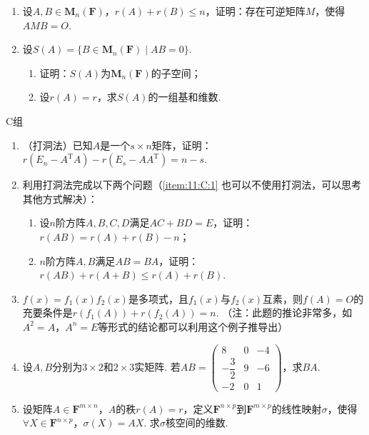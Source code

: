 \begin{enumerate}
    \item 设$A,B \in \mathbf{M}_n(\mathbf{F})$，$r(A)+r(B) \leqslant n$，证明：存在可逆矩阵$M$，使得$AMB=O$.

    \item 设$S(A)=\{B \in \mathbf{M}_n(\mathbf{F}) \mid AB=0\}$.
          \begin{enumerate}
              \item 证明：$S(A)$为$\mathbf{M}_n(\mathbf{F})$的子空间；

              \item 设$r(A)=r$，求$S(A)$的一组基和维数.
          \end{enumerate}
\end{enumerate}

\centerline{\heiti C组}
\begin{enumerate}
    \item （打洞法）已知$A$是一个$s \times n$矩阵，证明：$r(E_n-A^\mathrm{T}A)-r(E_s-AA^\mathrm{T})=n-s$.

    \item 利用打洞法完成以下两个问题（\ref*{item:11:C:1} 也可以不使用打洞法，可以思考其他方式解决）：
          \begin{enumerate}
              \item 设$n$阶方阵$A,B,C,D$满足$AC+BD=E$，证明：$r(AB) = r(A)+r(B)-n$；

              \item \label{item:11:C:1}
                    $n$阶方阵$A,B$满足$AB=BA$，证明：$r(AB)+r(A+B)\leqslant r(A)+r(B)$.
          \end{enumerate}

    \item $f(x)=f_1(x)f_2(x)$是多项式，且$f_1(x)$与$f_2(x)$互素，则$f(A)=O$的充要条件是$r(f_1(A))+r(f_2(A))=n$. （注：此题的推论非常多，如$A^2=A$，$A^n=E$等形式的结论都可以利用这个例子推导出）

    \item 设$A,B$分别为$3 \times 2$和$2 \times 3$实矩阵. 若$AB=\begin{pmatrix}
                  8             & 0 & -4 \\[0.8ex]
                  -\dfrac{3}{2} & 9 & -6 \\[0.8ex]
                  -2            & 0 & 1
              \end{pmatrix}$，求$BA$.

    \item 设矩阵$A \in \mathbf{F}^{m \times n}$，$A$的秩$r(A)=r$，定义$\mathbf{F}^{n \times p}$到$\mathbf{F}^{m \times p}$的线性映射$\sigma$，使得$\forall X \in \mathbf{F}^{n \times p}$，$\sigma(X)=AX$. 求$\sigma$核空间的维数.
\end{enumerate}
